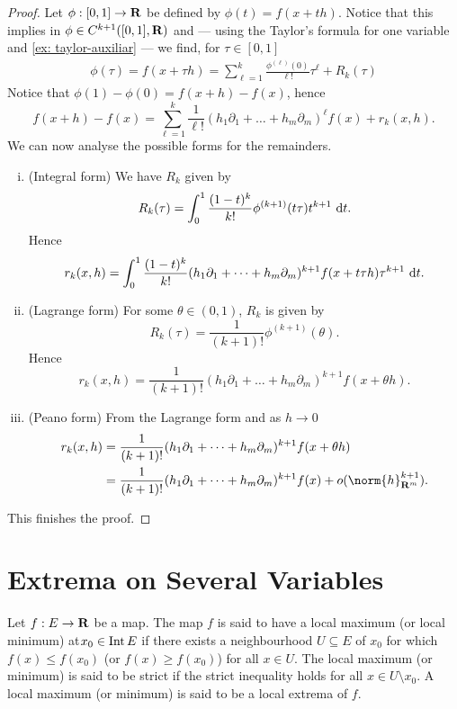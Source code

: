 \begin{proof}
  Let \(\phi: [0, 1] \to \mathbf{R}\) be defined by \(\phi(t) = f(x + th)\). Notice that
  this implies in \(\phi \in C^{k+1}([0, 1], \mathbf{R})\) and --- using the Taylor's formula
  for one variable and \cref{ex: taylor-auxiliar} --- we find, for \(\tau \in [0, 1]\)
  \begin{align*}
    \phi(\tau)
    = f(x + \tau h)
    = \sum_{\ell=1}^k \frac{\phi^{(\ell)}(0)}{\ell!} \tau^\ell + R_k(\tau)
  \end{align*}
  Notice that \(\phi(1) - \phi(0) = f(x + h) - f(x)\), hence
  \[
    f(x + h) - f(x) =
    \sum_{\ell=1}^k \frac 1 {\ell!}
    (h_1 \partial_1 + \dots + h_m \partial_m)^\ell f(x) + r_k(x, h).
  \]
  We can now analyse the possible forms for the remainders.
  \begin{enumerate}[(i)]
    \item (Integral form) We have \(R_k\) given by
      \[
        R_k(\tau) = \int_0^1 \frac{(1 - t)^k}{k!} \phi^{(k+1)}(t \tau) t^{k+1}\
        \mathrm{d} t.
      \]
      Hence
      \[
        r_k(x, h) = \int_0^1 \frac{(1 - t)^k}{k!}
        (h_1 \partial_1 + \dots + h_m \partial_m)^{k+1} f(x + t \tau h) \tau^{k
        + 1}\ \mathrm{d} t.
      \]
    \item (Lagrange form) For some \(\theta \in (0, 1)\), \(R_k\) is given by
      \[
        R_k(\tau) = \frac 1 {(k + 1)!} \phi^{(k+1)}(\theta).
      \]
      Hence
      \[
        r_k(x, h) = \frac 1 {(k + 1)!} (h_1 \partial_1 + \dots + h_m
        \partial_m)^{k+1} f(x + \theta h).
      \]
    \item (Peano form) From the Lagrange form and as \(h \to 0\)
      \begin{align*}
        r_k(x, h)
        &= \frac 1 {(k + 1)!} (h_1 \partial_1 + \dots + h_m \partial_m)^{k+1}
        f(x + \theta h) \\
        &= \frac 1 {(k + 1)!} (h_1 \partial_1 + \dots + h_m
        \partial_m)^{k+1} f(x) + o(\norm{h}_{\R^m}^{k+1}).
      \end{align*}
  \end{enumerate}
  This finishes the proof.
\end{proof}

\section{Extrema on Several Variables}

\begin{definition}
  \label{def:extrema-points}
  Let \(f: E \to \mathbf{R}\) be a map. The map \(f\) is said to have a local maximum (or
  local minimum) at\(x_0 \in \operatorname{Int} E\) if there exists a neighbourhood \(U \subseteq E\) of
  \(x_0\) for which \(f(x) \leq f(x_0)\) (or \(f(x) \geq f(x_0)\)) for all \(x \in
  U\). The local maximum (or minimum) is said to be strict if the strict
  inequality holds for all \(x \in U \setminus x_0\). A local maximum (or minimum) is said
  to be a local extrema of \(f\).
\end{definition}

